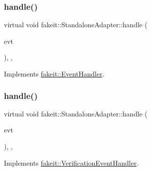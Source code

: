 \subsubsection{\texorpdfstring{handle()}{handle()}\hspace{0.1cm}{\footnotesize\ttfamily [4/6]}}
{\footnotesize\ttfamily virtual void fakeit\+::\+Standalone\+Adapter\+::handle (\begin{DoxyParamCaption}\item[{const \mbox{\hyperlink{structfakeit_1_1UnexpectedMethodCallEvent}{Unexpected\+Method\+Call\+Event}} \&}]{evt }\end{DoxyParamCaption})\hspace{0.3cm}{\ttfamily [inline]}, {\ttfamily [override]}, {\ttfamily [virtual]}}



Implements \mbox{\hyperlink{structfakeit_1_1EventHandler_a4de5ad05e5de73e36f4b2cede6d8efd3}{fakeit\+::\+Event\+Handler}}.

\mbox{\label{structfakeit_1_1StandaloneAdapter_a18270ea7ca75fa8fe690faac7969a808}} 
\subsubsection{\texorpdfstring{handle()}{handle()}\hspace{0.1cm}{\footnotesize\ttfamily [5/6]}}
{\footnotesize\ttfamily virtual void fakeit\+::\+Standalone\+Adapter\+::handle (\begin{DoxyParamCaption}\item[{const \mbox{\hyperlink{structfakeit_1_1SequenceVerificationEvent}{Sequence\+Verification\+Event}} \&}]{evt }\end{DoxyParamCaption})\hspace{0.3cm}{\ttfamily [inline]}, {\ttfamily [override]}, {\ttfamily [virtual]}}



Implements \mbox{\hyperlink{structfakeit_1_1VerificationEventHandler_adf355a9888bc2bf78ce0e1219bfb1379}{fakeit\+::\+Verification\+Event\+Handler}}.

\mbox{\label{structfakeit_1_1StandaloneAdapter_aa8eee53eed1912200af8681e94587bef}} 
